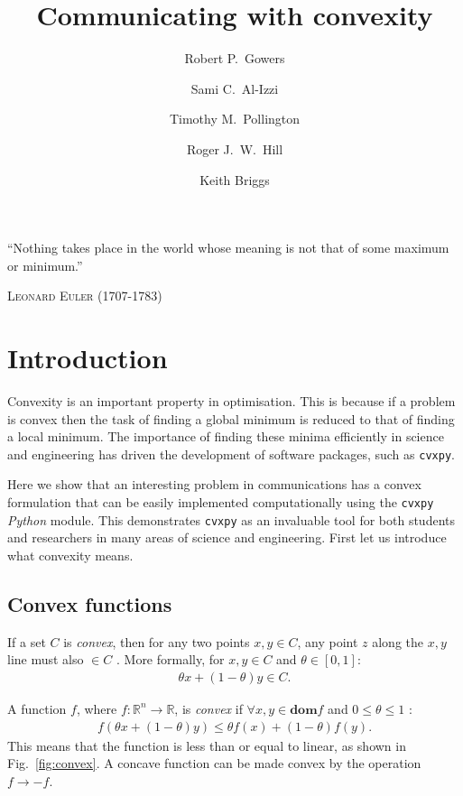 \documentclass[twocolumn,secnumarabic,amssymb, nobibnotes, aps, prl,superscriptaddress]{revtex4-1}
\newcommand{\NewsItem}[1]{%
		\large #1 \vspace{4pt}
		\par \normalsize \normalfont}
\newcommand{\NewsAuthor}[1]{%
			\hfill \textsc{#1} \vspace{4pt}
			\par \normalfont}
\begin{document}

\title{Communicating with convexity}
\author{Robert P.~Gowers}%
\author{Sami C.~Al-Izzi}%
\author{Timothy M.~Pollington}%
\author{Roger J.~W.~Hill}%
\author{Keith Briggs}
\maketitle


	\NewsItem{\noindent``Nothing takes place in the world whose meaning is not that of some maximum or minimum.''}
	\NewsAuthor{Leonard Euler (1707-1783)}
    
\section{Introduction}
\noindent Convexity is an important property in optimisation. This is because if a problem is convex then the task of finding a global minimum is reduced to that of finding a local minimum. The importance of finding these minima efficiently in science and engineering has driven the development of software packages, such as \texttt{cvxpy}.

Here we show that an interesting problem in communications has a convex formulation that can be easily implemented computationally using the \texttt{cvxpy} \textit{Python} module. This demonstrates \texttt{cvxpy} as an invaluable tool for both students and researchers in many areas of science and engineering. First let us introduce what convexity means.

\subsection{Convex functions}
If a set $C$ is \textit{convex}, then for any two points $x,y\in C$, any point $z$ along the $x,y$ line must also $\in C$ \cite[p.23]{cvxpybook}. More formally, for $x,y\in C$ and $\theta\in [0,1]$:
\begin{align}
\theta x + (1-\theta)y\in C.
\end{align}

\noindent A function $f$, where $f:\mathbb{R}^n \rightarrow \mathbb{R}$, is \textit{convex} if $\forall x,y\in \textbf{dom} f$ and $0 \leq \theta \leq 1$ \cite[p.67]{cvxpybook}:
\begin{align}
f(\theta x + (1-\theta)y) \leq \theta f(x)+(1-\theta)f(y).
\end{align}
This means that the function is less than or equal to linear, as shown in Fig.~\ref{fig:convex}. A concave function can be made convex by the operation $f\to-f$.
\end{document}
